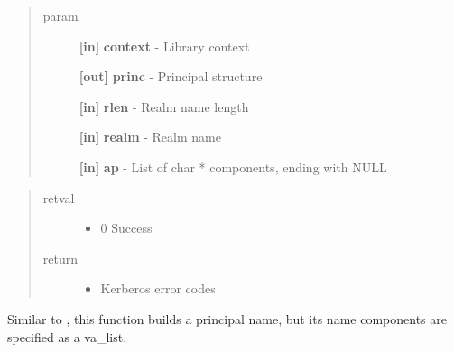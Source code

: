 \documentclass[letterpaper,10pt,english]{sphinxmanual}
\begin{document}
\begin{fulllineitems}
\label{appdev/refs/api/krb5_build_principal_alloc_va:krb5_build_principal_alloc_va}
\end{fulllineitems}

\begin{quote}\begin{description}
\item[{param}] \leavevmode
\textbf{{[}in{]}} \textbf{context} - Library context

\textbf{{[}out{]}} \textbf{princ} - Principal structure

\textbf{{[}in{]}} \textbf{rlen} - Realm name length

\textbf{{[}in{]}} \textbf{realm} - Realm name

\textbf{{[}in{]}} \textbf{ap} - List of char * components, ending with NULL

\end{description}\end{quote}
\begin{quote}\begin{description}
\item[{retval}] \leavevmode\begin{itemize}
\item {} 
0   Success

\end{itemize}

\item[{return}] \leavevmode\begin{itemize}
\item {} 
Kerberos error codes

\end{itemize}

\end{description}\end{quote}

Similar to {\hyperref[appdev/refs/api/krb5_build_principal:krb5_build_principal]{}} , this function builds a principal name, but its name components are specified as a va\_list.
\end{document}
